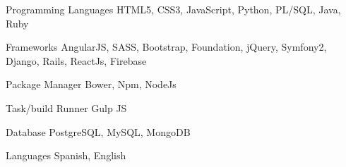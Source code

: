 


\begin{cvskills}


\cvskill
{Programming Languages} %
{HTML5, CSS3, JavaScript, Python, PL/SQL, Java, Ruby} %


\cvskill
{Frameworks} %
{AngularJS, SASS, Bootstrap, Foundation, jQuery, Symfony2, Django, Rails, ReactJs, Firebase} %


\cvskill
{Package Manager} %
{Bower, Npm, NodeJs} %


\cvskill
{Task/build Runner } %
{Gulp JS} %


\cvskill
{Database} %
{PostgreSQL, MySQL, MongoDB} %


\cvskill
{Languages} %
{Spanish, English} %




\end{cvskills}

